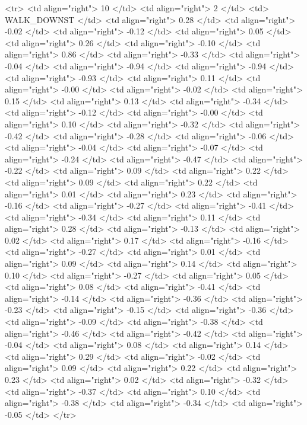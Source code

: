   <tr> <td align="right"> 10 </td> <td align="right">   2 </td> <td> WALK_DOWNST </td> <td align="right"> 0.28 </td> <td align="right"> -0.02 </td> <td align="right"> -0.12 </td> <td align="right"> 0.05 </td> <td align="right"> 0.26 </td> <td align="right"> -0.10 </td> <td align="right"> 0.86 </td> <td align="right"> -0.33 </td> <td align="right"> -0.04 </td> <td align="right"> -0.94 </td> <td align="right"> -0.94 </td> <td align="right"> -0.93 </td> <td align="right"> 0.11 </td> <td align="right"> -0.00 </td> <td align="right"> -0.02 </td> <td align="right"> 0.15 </td> <td align="right"> 0.13 </td> <td align="right"> -0.34 </td> <td align="right"> -0.12 </td> <td align="right"> -0.00 </td> <td align="right"> 0.10 </td> <td align="right"> -0.32 </td> <td align="right"> -0.42 </td> <td align="right"> -0.28 </td> <td align="right"> -0.06 </td> <td align="right"> -0.04 </td> <td align="right"> -0.07 </td> <td align="right"> -0.24 </td> <td align="right"> -0.47 </td> <td align="right"> -0.22 </td> <td align="right"> 0.09 </td> <td align="right"> 0.22 </td> <td align="right"> 0.09 </td> <td align="right"> 0.22 </td> <td align="right"> 0.01 </td> <td align="right"> 0.23 </td> <td align="right"> -0.16 </td> <td align="right"> -0.27 </td> <td align="right"> -0.41 </td> <td align="right"> -0.34 </td> <td align="right"> 0.11 </td> <td align="right"> 0.28 </td> <td align="right"> -0.13 </td> <td align="right"> 0.02 </td> <td align="right"> 0.17 </td> <td align="right"> -0.16 </td> <td align="right"> -0.27 </td> <td align="right"> 0.01 </td> <td align="right"> 0.09 </td> <td align="right"> 0.14 </td> <td align="right"> 0.10 </td> <td align="right"> -0.27 </td> <td align="right"> 0.05 </td> <td align="right"> 0.08 </td> <td align="right"> -0.41 </td> <td align="right"> -0.14 </td> <td align="right"> -0.36 </td> <td align="right"> -0.23 </td> <td align="right"> -0.15 </td> <td align="right"> -0.36 </td> <td align="right"> -0.09 </td> <td align="right"> -0.38 </td> <td align="right"> -0.46 </td> <td align="right"> -0.42 </td> <td align="right"> -0.04 </td> <td align="right"> 0.08 </td> <td align="right"> 0.14 </td> <td align="right"> 0.29 </td> <td align="right"> -0.02 </td> <td align="right"> 0.09 </td> <td align="right"> 0.22 </td> <td align="right"> 0.23 </td> <td align="right"> 0.02 </td> <td align="right"> -0.32 </td> <td align="right"> -0.37 </td> <td align="right"> 0.10 </td> <td align="right"> -0.38 </td> <td align="right"> -0.34 </td> <td align="right"> -0.05 </td> </tr>
